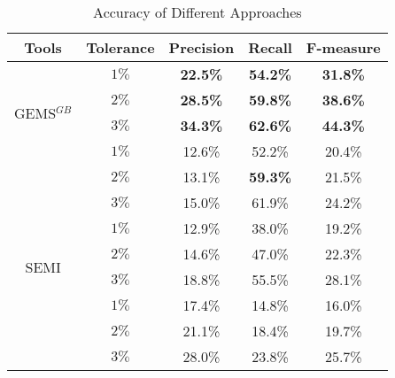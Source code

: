 \begin{table}[!t]
  \renewcommand{\arraystretch}{1.3}
  \caption{Accuracy of Different Approaches}
  \label{accuracy}
  \centering
  \begin{tabular}{cc|ccc}
  \toprule
   Tools &Tolerance &Precision &Recall &F-measure\\ 
  \hline
  \multirow{4}{*}{GEMS$^{GB}$}&$1\%$ &\bf{22.5\%} &\bf{54.2\%} &\bf{31.8\%} \\ 
  &$2\%$ &\bf{28.5\%} &\bf{59.8\%} &\bf{38.6\%} \\ 
  &$3\%$ &\bf{34.3\%} &\bf{62.6\%} &\bf{44.3\%} \\ 
  \hline
  \multirow{4}{*}{JExtract}&$1\%$ &12.6\% &52.2\% &20.4\% \\ 
  &$2\%$ &13.1\% &\bf{59.3\%} &21.5\% \\ 
  &$3\%$ &15.0\% &61.9\% &24.2\% \\ 
  \hline
  \multirow{4}{*}{SEMI}&$1\%$ &12.9\% &38.0\% &19.2\% \\ 
  &$2\%$ &14.6\% &47.0\% &22.3\% \\ 
  &$3\%$ &18.8\% &55.5\% &28.1\% \\ 
  \hline
  \multirow{4}{*}{JDeodorant}&$1\%$ &17.4\% &14.8\% &16.0\% \\
  &$2\%$ &21.1\% &18.4\% &19.7\% \\ 
  &$3\%$ &28.0\% &23.8\% &25.7\% \\ 
  \bottomrule
  \end{tabular}
  \end{table}

